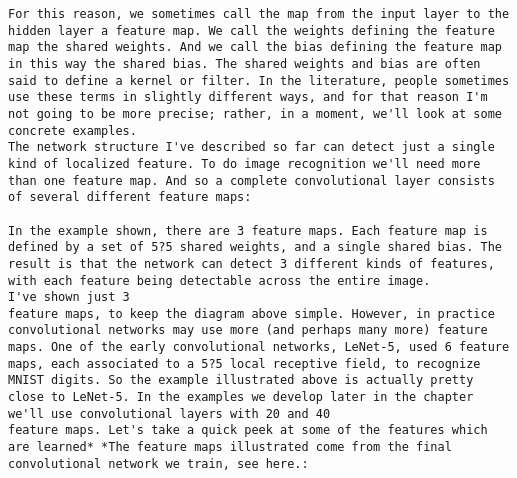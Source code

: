 \begin{lstlisting}
For this reason, we sometimes call the map from the input layer to the hidden layer a feature map. We call the weights defining the feature map the shared weights. And we call the bias defining the feature map in this way the shared bias. The shared weights and bias are often said to define a kernel or filter. In the literature, people sometimes use these terms in slightly different ways, and for that reason I'm not going to be more precise; rather, in a moment, we'll look at some concrete examples.
The network structure I've described so far can detect just a single kind of localized feature. To do image recognition we'll need more than one feature map. And so a complete convolutional layer consists of several different feature maps:

In the example shown, there are 3 feature maps. Each feature map is defined by a set of 5?5 shared weights, and a single shared bias. The result is that the network can detect 3 different kinds of features, with each feature being detectable across the entire image.
I've shown just 3
feature maps, to keep the diagram above simple. However, in practice convolutional networks may use more (and perhaps many more) feature maps. One of the early convolutional networks, LeNet-5, used 6 feature maps, each associated to a 5?5 local receptive field, to recognize MNIST digits. So the example illustrated above is actually pretty close to LeNet-5. In the examples we develop later in the chapter we'll use convolutional layers with 20 and 40
feature maps. Let's take a quick peek at some of the features which are learned* *The feature maps illustrated come from the final convolutional network we train, see here.:


\end{lstlisting}
